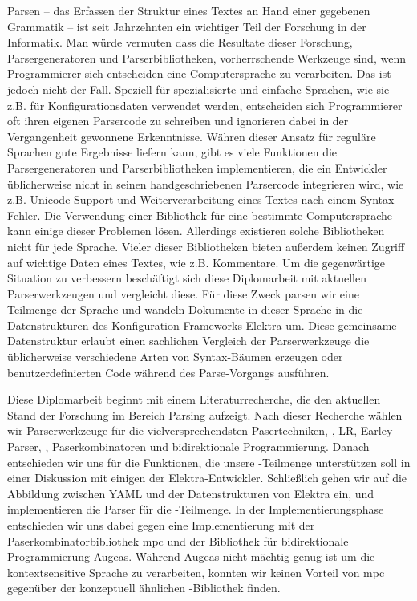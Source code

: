 \begin{kurzfassung}
Parsen – das Erfassen der Struktur eines Textes an Hand einer gegebenen Grammatik – ist seit Jahrzehnten ein wichtiger Teil der Forschung in der Informatik. Man würde vermuten dass die Resultate dieser Forschung, Parsergeneratoren und Parserbibliotheken, vorherrschende Werkzeuge sind, wenn Programmierer sich entscheiden eine Computersprache zu verarbeiten. Das ist jedoch nicht der Fall. Speziell für spezialisierte und einfache Sprachen, wie sie z.B. für Konfigurationsdaten verwendet werden, entscheiden sich Programmierer oft ihren eigenen Parsercode zu schreiben und ignorieren dabei in der Vergangenheit gewonnene Erkenntnisse. Währen dieser Ansatz für reguläre Sprachen gute Ergebnisse liefern kann, gibt es viele Funktionen die Parsergeneratoren und Parserbibliotheken implementieren, die ein Entwickler üblicherweise nicht in seinen handgeschriebenen Parsercode integrieren wird, wie z.B. Unicode-Support und Weiterverarbeitung eines Textes nach einem Syntax-Fehler. Die Verwendung einer Bibliothek für eine bestimmte Computersprache kann einige dieser Problemen lösen. Allerdings existieren solche Bibliotheken nicht für jede Sprache. Vieler dieser Bibliotheken bieten außerdem keinen Zugriff auf wichtige Daten eines Textes, wie z.B. Kommentare. Um die gegenwärtige Situation zu verbessern beschäftigt sich diese Diplomarbeit mit aktuellen Parserwerkzeugen und vergleicht diese. Für diese Zweck parsen wir eine Teilmenge der Sprache  und wandeln Dokumente in dieser Sprache in die Datenstrukturen des Konfiguration-Frameworks Elektra um. Diese gemeinsame Datenstruktur erlaubt einen sachlichen Vergleich der Parserwerkzeuge die üblicherweise verschiedene Arten von Syntax-Bäumen erzeugen oder benutzerdefinierten Code während des Parse-Vorgangs ausführen.

Diese Diplomarbeit beginnt mit einem Literaturrecherche, die den aktuellen Stand der Forschung im Bereich Parsing aufzeigt. Nach dieser Recherche wählen wir Parserwerkzeuge für die vielversprechendsten Pasertechniken, , LR, Earley Parser, , Paserkombinatoren und bidirektionale Programmierung. Danach entschieden wir uns für die Funktionen, die unsere -Teilmenge unterstützen soll in einer Diskussion mit einigen der Elektra-Entwickler. Schließlich gehen wir auf die Abbildung zwischen YAML und der Datenstrukturen von Elektra ein, und implementieren die Parser für die -Teilmenge. In der Implementierungsphase entschieden wir uns dabei gegen eine Implementierung mit der Paserkombinatorbibliothek mpc und der Bibliothek für bidirektionale Programmierung Augeas. Während Augeas nicht mächtig genug ist um die kontextsensitive Sprache  zu verarbeiten, konnten wir keinen Vorteil von mpc gegenüber der konzeptuell ähnlichen -Bibliothek  finden.


\end{kurzfassung}
